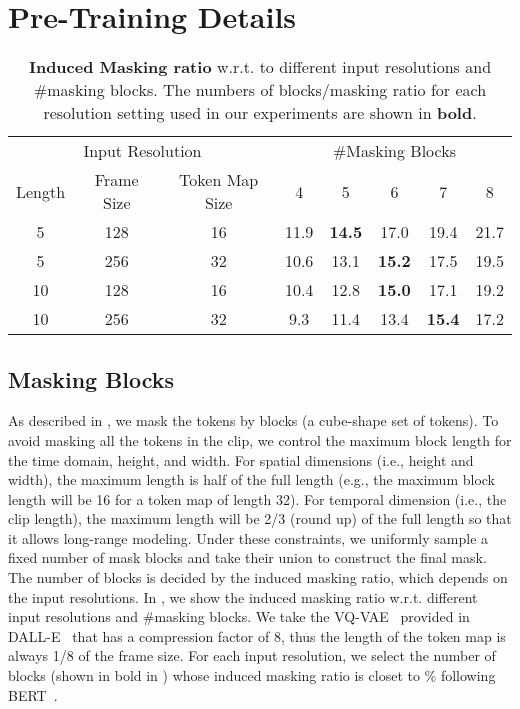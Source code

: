 \section{Pre-Training Details}
\label{sec:appen_pretrain}
\begin{table}
\centering
\caption{\textbf{Induced Masking ratio} w.r.t. to different input resolutions and \#masking blocks. The numbers of blocks/masking ratio for each resolution setting used in our experiments are shown in \textbf{bold}.}
\begin{tabular}{ccc|ccccc}
\toprule
\multicolumn{3}{c|}{Input Resolution} & \multicolumn{5}{c}{\#Masking Blocks}                          \\ \cline{4-8} 
Length          & Frame Size        & Token Map Size & 4    & 5             & 6             & 7             & 8    \\ \hline
5               & 128              & 16                & 11.9 & \textbf{14.5} & 17.0          & 19.4          & 21.7 \\
5               & 256               & 32                & 10.6 & 13.1          & \textbf{15.2} & 17.5          & 19.5 \\
10              & 128               & 16                & 10.4 & 12.8          & \textbf{15.0} & 17.1          & 19.2 \\
10              & 256               & 32                & 9.3  & 11.4          & 13.4          & \textbf{15.4} & 17.2 \\ \bottomrule
\end{tabular}\label{tab:appen_masking_blocks}
\end{table}

\subsection{Masking Blocks}

\label{sec:appen_masking_blocks}
As described in , we mask the tokens by blocks (a cube-shape set of tokens).
To avoid masking all the tokens in the clip, we control the maximum block length for the time domain, height, and width.
For spatial dimensions (i.e., height and width), the maximum length is half of the full length (e.g., the maximum block length will be 16 for a token map of length 32).
For temporal dimension (i.e., the clip length), the maximum length will be 2/3 (round up) of the full length so that it allows long-range modeling.
Under these constraints, we uniformly sample a fixed number of mask blocks and take their union to construct the final mask.
The number of blocks is decided by the induced masking ratio, which depends on the input resolutions.
In , we show the induced masking ratio w.r.t. different input resolutions and \#masking blocks.
We take the VQ-VAE~\cite{van2017neural} provided in DALL-E~\cite{ramesh2021zero} that has a compression factor of 8, thus the length of the token map is always 1/8 of the frame size.
For each input resolution, we select the number of blocks (shown in bold in ) whose induced masking ratio is closet to \% following BERT~\cite{devlin2019bert}.




